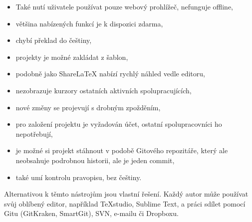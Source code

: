 \begin{itemize}
	\item Také nutí uživatele používat pouze webový prohlížeč, nefunguje offline,
	\item většina nabízených funkcí je k dispozici zdarma,
	\item chybí překlad do češtiny,
	\item projekty je možné zakládat z šablon,
	\item podobně jako ShareLaTeX nabízí rychlý náhled vedle editoru,
	\item nezobrazuje kurzory ostatních aktivních spolupracujících,
	\item nové změny se projevují s drobným zpožděním,
	\item pro založení projektu je vyžadován účet, ostatní spolupracovníci ho nepotřebují,
	\item je možné si projekt stáhnout v podobě Gitového repozitáře, který ale neobsahuje podrobnou historii, ale je jeden commit,
	\item také umí kontrolu pravopisu, bez češtiny.
\end{itemize}

Alternativou k těmto nástrojům jsou vlastní řešení. Každý autor může používat svůj oblíbený editor, například TeXstudio, Sublime Text, a práci sdílet pomocí Gitu (GitKraken, SmartGit), SVN, e-mailu či Dropboxu.
